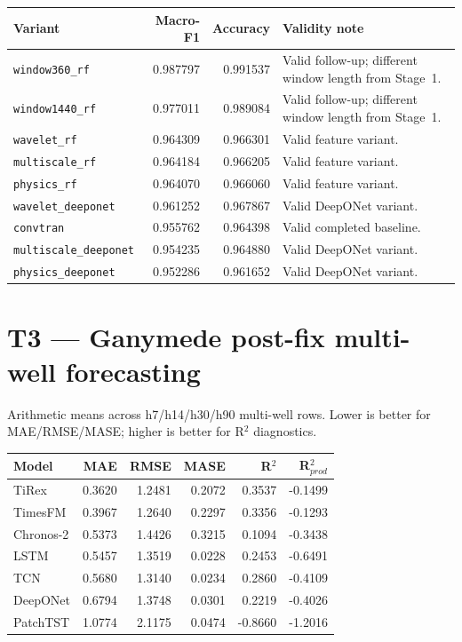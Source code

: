 \documentclass[11pt]{article}
\begin{document}
\begin{tabular}{lrrp{2.6in}}
\toprule
Variant & Macro-F1 & Accuracy & Validity note \\
\midrule
\texttt{window360\_rf} & 0.987797 & 0.991537 & Valid follow-up; different window length from Stage~1. \\
\texttt{window1440\_rf} & 0.977011 & 0.989084 & Valid follow-up; different window length from Stage~1. \\
\texttt{wavelet\_rf} & 0.964309 & 0.966301 & Valid feature variant. \\
\texttt{multiscale\_rf} & 0.964184 & 0.966205 & Valid feature variant. \\
\texttt{physics\_rf} & 0.964070 & 0.966060 & Valid feature variant. \\
\texttt{wavelet\_deeponet} & 0.961252 & 0.967867 & Valid DeepONet variant. \\
\texttt{convtran} & 0.955762 & 0.964398 & Valid completed baseline. \\
\texttt{multiscale\_deeponet} & 0.954235 & 0.964880 & Valid DeepONet variant. \\
\texttt{physics\_deeponet} & 0.952286 & 0.961652 & Valid DeepONet variant. \\
\bottomrule
\end{tabular}

\section*{T3 --- Ganymede post-fix multi-well forecasting}
Arithmetic means across h7/h14/h30/h90 multi-well rows. Lower is better for MAE/RMSE/MASE; higher is better for R$^2$ diagnostics.

\begin{tabular}{lrrrrr}
\toprule
Model & MAE & RMSE & MASE & R$^2$ & R$^2_{prod}$ \\
\midrule
TiRex & 0.3620 & 1.2481 & 0.2072 & 0.3537 & -0.1499 \\
TimesFM & 0.3967 & 1.2640 & 0.2297 & 0.3356 & -0.1293 \\
Chronos-2 & 0.5373 & 1.4426 & 0.3215 & 0.1094 & -0.3438 \\
LSTM & 0.5457 & 1.3519 & 0.0228 & 0.2453 & -0.6491 \\
TCN & 0.5680 & 1.3140 & 0.0234 & 0.2860 & -0.4109 \\
DeepONet & 0.6794 & 1.3748 & 0.0301 & 0.2219 & -0.4026 \\
PatchTST & 1.0774 & 2.1175 & 0.0474 & -0.8660 & -1.2016 \\
\bottomrule
\end{tabular}
\end{document}
